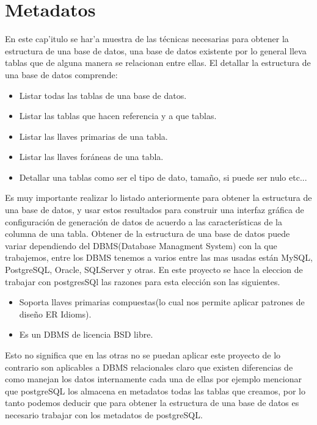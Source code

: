 \chapter{Metadatos}

En este cap'itulo se har'a muestra de las t\'ecnicas necesarias para obtener la estructura de una base de datos, una base de datos existente por lo general lleva tablas que de alguna manera se relacionan entre ellas. El detallar la estructura de una base de datos comprende:
\begin{itemize}
\item Listar todas las tablas de una base de datos.
\item Listar las tablas que hacen referencia y a que tablas.
\item Listar las llaves primarias de una tabla.
\item Listar las llaves for\'aneas de una tabla.
\item Detallar una tablas como ser el tipo de dato, tama\~no, si puede ser nulo etc... 
\end{itemize} 
Es muy importante realizar lo listado anteriormente para obtener la estructura de una base de datos, y usar estos resultados para construir una interfaz gr\'afica de configuraci\'on de generaci\'on de datos de acuerdo a las caracter\'isticas de la columna de una tabla.
Obtener de la estructura de una base de datos puede variar dependiendo del DBMS(Database Managment System) con la que trabajemos, entre los DBMS tenemos a varios entre las mas usadas est\'an MySQL, PostgreSQL, Oracle, SQLServer y otras. En este proyecto se hace la eleccion de  trabajar con postgresSQl las razones para esta elecci\'on son las siguientes.
\begin{itemize}
\item Soporta llaves primarias compuestas(lo cual nos permite aplicar patrones de dise\~no ER Idioms).
\item Es un DBMS de licencia BSD libre.
\end{itemize}
Esto no significa que en las otras no se puedan aplicar este proyecto de lo contrario son aplicables a DBMS relacionales claro que existen diferencias de como manejan los datos internamente cada una de ellas por ejemplo mencionar que postgreSQL los almacena en metadatos todas las tablas que creamos, por lo tanto podemos deducir que para obtener la estructura de una base de datos es necesario trabajar con los metadatos de postgreSQL.

